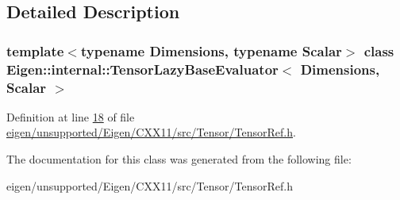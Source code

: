 \subsection{Detailed Description}
\subsubsection*{template$<$typename Dimensions, typename Scalar$>$\newline
class Eigen\+::internal\+::\+Tensor\+Lazy\+Base\+Evaluator$<$ Dimensions, Scalar $>$}



Definition at line \hyperlink{eigen_2unsupported_2_eigen_2_c_x_x11_2src_2_tensor_2_tensor_ref_8h_source_l00018}{18} of file \hyperlink{eigen_2unsupported_2_eigen_2_c_x_x11_2src_2_tensor_2_tensor_ref_8h_source}{eigen/unsupported/\+Eigen/\+C\+X\+X11/src/\+Tensor/\+Tensor\+Ref.\+h}.



The documentation for this class was generated from the following file\+:\begin{DoxyCompactItemize}
\item 
eigen/unsupported/\+Eigen/\+C\+X\+X11/src/\+Tensor/\+Tensor\+Ref.\+h\end{DoxyCompactItemize}
